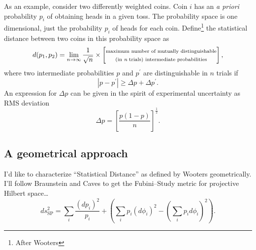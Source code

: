 As an example, consider two differently weighted coins.  Coin $i$ has
an {\it a priori} probability $p_i$ of obtaining heads in a given toss.
The probability space is one dimensional, just the probability 
$p_i$ of heads for each coin.
Define\footnote{After Wooters\cite{Wooters:81}} 
the statistical distance between two coins in this probability space as
\begin{equation}
d(p_1,p_2) = \lim_{n\to\infty} \frac{1}{\sqrt{n}}\times
    \left[\begin{matrix}
        \text{\scriptsize maximum number of mutually distinguishable}\\
        \text{\scriptsize (in {\it n} trials) intermediate probabilities}
    \end{matrix}\right],
\label{e:ClassicalDistance}
\end{equation}
where two intermediate probabilities $p$ and $p^\prime$ are distinguishable
in $n$ trials if 
\begin{equation}
\left| p-p^\prime \right| \ge \Delta p + \Delta p^\prime.
\end{equation}
An expression for $\Delta p$ can be given in the spirit of experimental
uncertainty as RMS deviation
\begin{equation}
\Delta p = \left[ \frac{p(1-p)}{n} \right]^\frac{1}{2}.
\end{equation}


\subsection{A geometrical approach}

I'd like to characterize ``Statistical Distance'' as defined by Wooters\cite{Wooters:81}
geometrically.  I'll follow Braunstein and Caves\cite{Braunstein/Caves:94}
to get the Fubini--Study metric for projective Hilbert space\dots
\begin{equation}
                ds_{\text{SP}}^2 = \sum_i \frac{(dp_i)^2}{p_i} + 
                \left( 
                    \sum_i p_i(d\phi_i)^2 - \left( \sum_i p_i d\phi_i \right)^2
                \right).
\end{equation}

